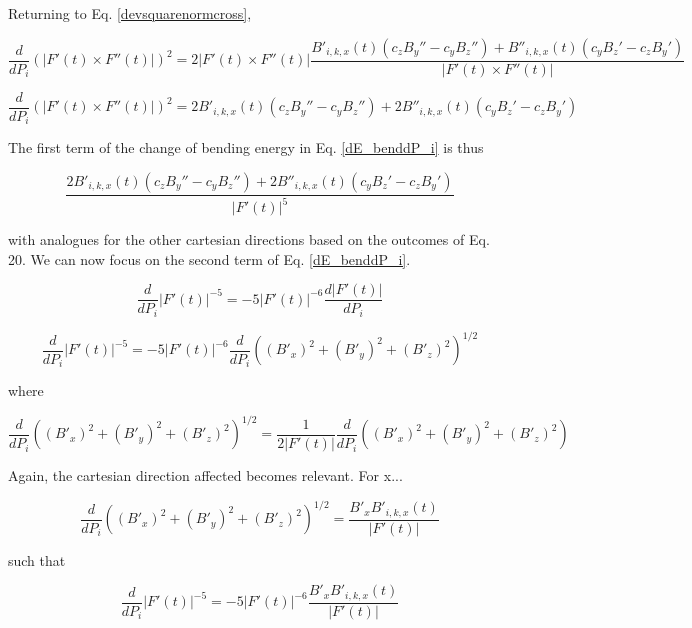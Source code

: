 \documentclass{article}
\begin{document}
\noindent
Returning to Eq. \ref{devsquarenormcross},

\begin{equation}
    \frac{d}{dP_i}(|F'(t) \times F''(t)|)^2 = 2 |F'(t) \times F''(t)| \frac{B'_{i,k,x}(t)(c_zB_y''-c_yB_z'') + B''_{i,k,x}(t)(c_yB_z' - c_zB_y')}{|F'(t) \times F''(t)|}
\end{equation}

\begin{equation}
    \frac{d}{dP_i}(|F'(t) \times F''(t)|)^2 = 2B'_{i,k,x}(t)(c_zB_y''-c_yB_z'') + 2B''_{i,k,x}(t)(c_yB_z' - c_zB_y')
\end{equation}

\noindent
The first term of the change of bending energy in Eq. \ref{dE_benddP_i} is thus

\begin{equation}
    \frac{2B'_{i,k,x}(t)(c_zB_y''-c_yB_z'') + 2B''_{i,k,x}(t)(c_yB_z' - c_zB_y')}{|F'(t)|^{5}}
\end{equation}

\noindent
with analogues for the other cartesian directions based on the outcomes of Eq. 20. We can now focus on the second term of Eq. \ref{dE_benddP_i}.

\begin{equation}
    \frac{d}{dP_i}|F'(t)|^{-5} = -5|F'(t)|^{-6}\frac{d|F'(t)|}{dP_i}
\end{equation}

\begin{equation}
    \frac{d}{dP_i}|F'(t)|^{-5} = -5|F'(t)|^{-6}\frac{d}{dP_i} ((B'_x)^2 + (B'_y)^2 + (B'_z)^2)^{1/2}
\end{equation}

\noindent
where

\begin{equation}
    \frac{d}{dP_i} ((B'_x)^2 + (B'_y)^2 + (B'_z)^2)^{1/2} = \frac{1}{2|F'(t)|} \frac{d}{dP_i}((B'_x)^2 + (B'_y)^2 + (B'_z)^2)
\end{equation}

Again, the cartesian direction affected becomes relevant. For x...

\begin{equation}
    \frac{d}{dP_i} ((B'_x)^2 + (B'_y)^2 + (B'_z)^2)^{1/2} = \frac{B'_x B'_{i,k,x}(t)}{|F'(t)|} 
\end{equation}

\noindent
such that

\begin{equation}
    \frac{d}{dP_i}|F'(t)|^{-5} = -5|F'(t)|^{-6}\frac{B'_x B'_{i,k,x}(t)}{|F'(t)|}
\end{equation}
\end{document}
